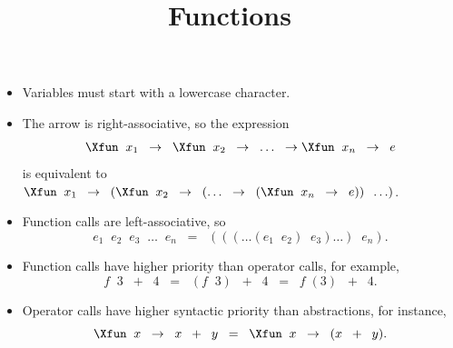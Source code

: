 \documentclass[wide]{slides}
\begin{document}
\begin{slide}
  \title{Functions}

  \begin{itemize}

    \item Variables must start with a lowercase character.

    \item The arrow is right-associative, so the expression
      \begin{equation*}
        \Xfun \;\; x_1 \;\; \rightarrow \;\; \Xfun \;\; x_2 \;\;
        \rightarrow \;\; \ldots \;\;
        \rightarrow \Xfun \;\; x_n \;\; \rightarrow \;\; e
      \end{equation*}
      is equivalent to \(\Xfun \;\; x_1 \;\; \rightarrow \;\; (\Xfun
      \;\; x_2 \;\; \rightarrow \;\; (\ldots \;\; \rightarrow \;\;
      (\Xfun \;\; x_n \;\; \rightarrow \;\; e)) \;\; \ldots)\).

    \item Function calls are left\hyp{}associative, so
      \begin{equation*}
        e_1 \;\; e_2 \;\; e_3 \;\; \ldots \;\; e_n \;\;=\;\; (((\ldots
        (e_1 \;\; e_2) \;\; e_3) \ldots) \;\; e_n).
      \end{equation*}

    \item Function calls have higher priority than operator calls, for
      example,
      \begin{equation*}
        f \;\; 3 \;\; + \;\; 4 \;\; = \;\; (f \;\; 3) \;\; + \;\; 4
        \;\; = \;\; f\;(3) \;\; + \;\; 4.
      \end{equation*}

    \item Operator calls have higher syntactic priority than
      abstractions, for instance,
      \begin{equation*}
        \Xfun \;\; x \;\; \rightarrow \;\; x \;\; + \;\; y \;\;=\;\;
        \Xfun \;\; x \;\; \rightarrow \;\; (x \;\; + \;\; y).
      \end{equation*}

\end{itemize}

\end{slide}
\end{document}
